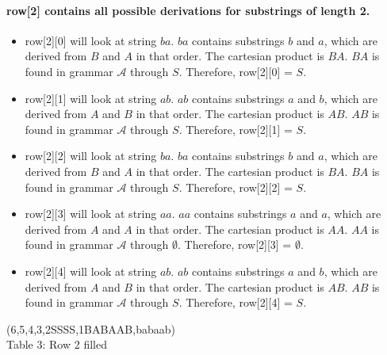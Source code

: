 \documentclass[12pt]{article}
\newcommand{\rowTwo}[7]{
    row[#1][#2] will look at string $#3#4$. $#3#4$ contains substrings $#3$ and $#4$, which are derived from $#5$ and $#6$ in that order. The cartesian product is $#5#6$. $#5#6$ is found in grammar $\mathcal{A}$ through $#7$. Therefore, row[#1][#2] = $#7$.    
}
\begin{document}
\paragraph{row[2] contains all possible derivations for substrings of length 2.}
\begin{itemize}
    \item \rowTwo{2}{0}{b}{a}{B}{A}{S}
    \item \rowTwo{2}{1}{a}{b}{A}{B}{S}
    \item \rowTwo{2}{2}{b}{a}{B}{A}{S}
    \item \rowTwo{2}{3}{a}{a}{A}{A}{\emptyset}
    \item \rowTwo{2}{4}{a}{b}{A}{B}{S}
\end{itemize}

\begin{center}
    \young(6\hfill,5\hfill \hfill,4\hfill \hfill \hfill,3\hfill \hfill \hfill \hfill,2SSS\emptyset S,1BABAAB,\hfill babaab) \\
    Table 3: Row 2 filled
\end{center}
\end{document}
